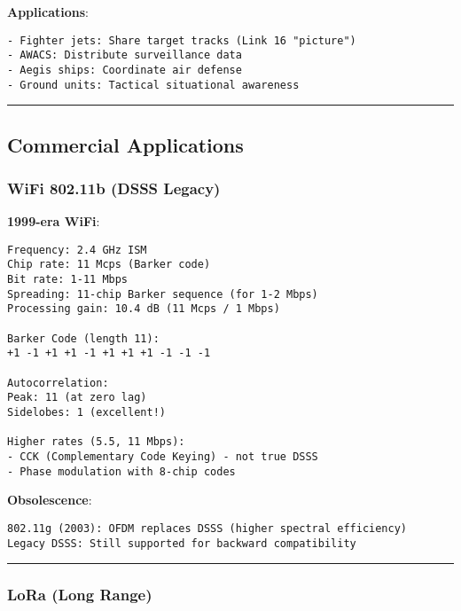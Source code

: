 \textbf{Applications}:

\begin{verbatim}
- Fighter jets: Share target tracks (Link 16 "picture")
- AWACS: Distribute surveillance data
- Aegis ships: Coordinate air defense
- Ground units: Tactical situational awareness
\end{verbatim}

\begin{center}\rule{0.5\linewidth}{0.5pt}\end{center}

\subsection{\texorpdfstring{ Commercial
Applications}{ Commercial Applications}}\label{commercial-applications}

\subsubsection{WiFi 802.11b (DSSS
Legacy)}\label{wifi-802.11b-dsss-legacy}

\textbf{1999-era WiFi}:

\begin{verbatim}
Frequency: 2.4 GHz ISM
Chip rate: 11 Mcps (Barker code)
Bit rate: 1-11 Mbps
Spreading: 11-chip Barker sequence (for 1-2 Mbps)
Processing gain: 10.4 dB (11 Mcps / 1 Mbps)

Barker Code (length 11):
+1 -1 +1 +1 -1 +1 +1 +1 -1 -1 -1

Autocorrelation:
Peak: 11 (at zero lag)
Sidelobes: 1 (excellent!)

Higher rates (5.5, 11 Mbps):
- CCK (Complementary Code Keying) - not true DSSS
- Phase modulation with 8-chip codes
\end{verbatim}

\textbf{Obsolescence}:

\begin{verbatim}
802.11g (2003): OFDM replaces DSSS (higher spectral efficiency)
Legacy DSSS: Still supported for backward compatibility
\end{verbatim}

\begin{center}\rule{0.5\linewidth}{0.5pt}\end{center}

\subsubsection{LoRa (Long Range)}\label{lora-long-range}

